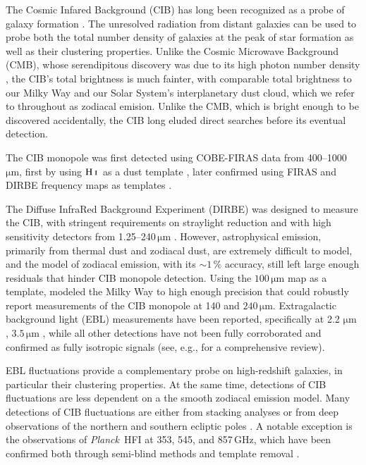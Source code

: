 \documentclass{aa}
\def\Planck{\textit{Planck}}
\newcommand{\mathsc}[1]{{\normalfont\textsc{#1}}}
\newcommand{\hi}{\ensuremath{\mathsc {H\ i}}}
\begin{document}

The Cosmic Infared Background (CIB) has long been recognized as a probe of galaxy formation \citep{partridge1967}. The unresolved radiation from distant galaxies can be used to probe both the total number density of galaxies at the peak of star formation as well as their clustering properties. Unlike the Cosmic Microwave Background (CMB), whose serendipitous discovery was due to its high photon number density \citep{penzias:1965}, the CIB's total brightness is much fainter, with comparable total brightness to our Milky Way and our Solar System's interplanetary dust cloud, which we refer to throughout as zodiacal emision. Unlike the CMB, which is bright enough to be discovered accidentally, the CIB long eluded direct searches before its eventual detection.

The CIB monopole was first detected using COBE-FIRAS data from 400--1000\,$\mathrm{\mu m}$, first by using \hi\ as a dust template \citep{puget1996}, later confirmed using FIRAS and DIRBE frequency maps as templates \citep{fixsen1998}.

The Diffuse InfraRed Background Experiment (DIRBE) was designed to measure the CIB, with stringent requirements on straylight reduction and with high sensitivity detectors from 1.25--240\,$\mathrm{\mu m}$ \citep{boggess92,hauser1998}. However, astrophysical emission, primarily from thermal dust and zodiacal dust, are extremely difficult to model, and the \citet{kelsall1998} model of zodiacal emission, with its  $\sim1\,\%$ accuracy, still left large enough residuals that hinder CIB monopole detection. Using the $100\,\mathrm{\mu m}$ map as a template, \citet{arendt1998} modeled the Milky Way to high enough precision that \citet{hauser1998} could robustly report measurements of the CIB monopole at 140 and $240\,\mathrm{\mu m}$. Extragalactic background light (EBL) measurements have been reported, specifically at 2.2 $\mathrm{\mu m}$ \citep{wright:2000,gorjian:2000,wright:2001}, $3.5\,\mathrm{\mu m}$ \citep{dwek:1998b,gorjian:2000,wright:2000}, while all other detections have not been fully corroborated and confirmed as fully isotropic signals (see, e.g., \citealt{hauser:2001} for a comprehensive review).

EBL fluctuations provide a complementary probe on high-redshift galaxies, in particular their clustering properties. At the same time, detections of CIB fluctuations are less dependent on a the smooth zodiacal emission model. Many detections of CIB fluctuations are either from stacking analyses \citep{dole:2006} or from deep observations of the northern and southern ecliptic poles \citep{matsumoto:2011}. A notable exception is the observations of \Planck\ HFI at 353, 545, and 857\,GHz, which have been confirmed both through semi-blind methods \citep{planck2016-XLVIII,mccarthy:2024} and template removal \citep{lenz2019}.
\end{document}
